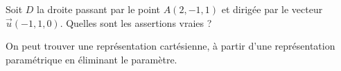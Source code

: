 \begin{question} 
Soit $D$ la droite passant par le point $A(2,-1,1)$ et dirigée par le vecteur $\vec{u}(-1,1,0)$. Quelles sont les assertions vraies ?
\begin{answers}


 
    
    
     
   
\end{answers}
\begin{explanations}
On peut trouver une représentation cartésienne, à partir d'une représentation   paramétrique en éliminant le paramètre.
\end{explanations}

\end{question}


